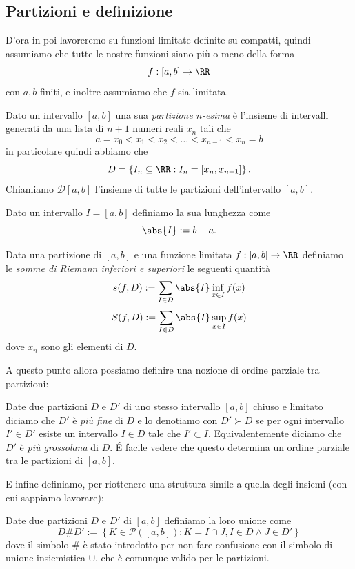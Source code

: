 \documentclass[11pt]{scrartcl}
\begin{document}
	\subsection{Partizioni e definizione}
	D'ora in poi lavoreremo su funzioni limitate definite su compatti, quindi assumiamo che tutte le nostre funzioni siano più o meno della forma
	$$f:[a,b]\to \RR$$
	con $a,b$ finiti, e inoltre assumiamo che $f$ sia limitata.
	\begin{definition}[Partizione]
		Dato un intervallo $[a,b]$ una sua \textit{partizione $n$-esima} è l'insieme di intervalli generati da una lista di $n+1$ numeri reali $x_n$ tali che
		$$a=x_0<x_1<x_2<\dots<x_{n-1}<x_n=b$$
		in particolare quindi abbiamo che 
		$$D=\left\{I_n\subseteq \RR:I_n=[x_n,x_{n+1}]\right\}.$$
		Chiamiamo $\mathcal{D}[a,b]$ l'insieme di tutte le partizioni dell'intervallo $[a,b]$. 
	\end{definition}
	\begin{definition}
		Dato un intervallo $I=[a,b]$ definiamo la sua lunghezza come
		$$\abs{I}:=b-a.$$
 	\end{definition}
	\begin{definition}
		Data una partizione di $[a,b]$ e una funzione limitata $f:[a,b]\to\RR$ definiamo le \textit{somme di Riemann inferiori e superiori} le seguenti quantità
		$$s(f,D):=\sum_{I\in D}\abs{I}\inf_{x\in I}f(x)$$
		$$S(f,D):=\sum_{I\in D}\abs{I}\sup_{x\in I}f(x)$$
		dove $x_n$ sono gli elementi di $D$.
	\end{definition}
	A questo punto allora possiamo definire una nozione di ordine parziale tra partizioni:
	\begin{definition}
		Date due partizioni $D$ e $D'$ di uno stesso intervallo $[a,b]$ chiuso e limitato diciamo che $D'$ è \textit{più fine} di $D$ e lo denotiamo con $D'\succ D$ se per ogni intervallo $I'\in D'$ esiste un intervallo $I\in D$ tale che $I'\subset I$. Equivalentemente diciamo che $D'$ è \textit{più grossolana} di $D$. \'E facile vedere che questo determina un ordine parziale tra le partizioni di $[a,b]$.
	\end{definition}
	E infine definiamo, per riottenere una struttura simile a quella degli insiemi (con cui sappiamo lavorare):
	\begin{definition}
		Date due partizioni $D$ e $D'$ di $[a,b]$ definiamo la loro unione come
		$$D\# D':=\left\{K\in \mathcal{P}\!\left([a,b]\right):K=I\cap J, I\in D\land J\in D'\right\}$$
		dove il simbolo $\#$ è stato introdotto per non fare confusione con il simbolo di unione insiemistica $\cup$, che è comunque valido per le partizioni.
	\end{definition}
\end{document}

